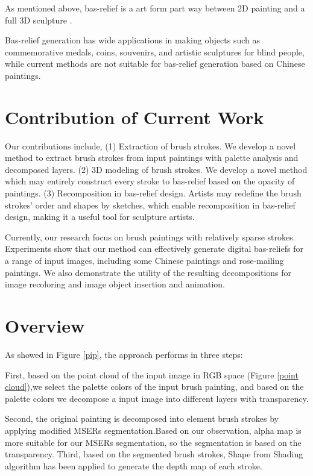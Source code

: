 As mentioned above, bas-relief is a art form part way between 2D painting and a full 3D sculpture\cite{benzaid2017analysis}\cite{weyrich2007digital}\cite{kerber2009feature}\cite{kerber2012computer}\cite{zeng2014region} .

Bas-relief generation has wide applications in making objects such as commemorative medals, coins, souvenirs, and artistic sculptures for blind people, while current methods are not suitable for bas-relief generation based on Chinese paintings. 



\section{Contribution of Current Work}
Our contributions include,
\newline
(1) Extraction of brush strokes. We develop a novel method to extract brush strokes from input paintings with palette analysis and decomposed layers.
\newline
(2) 3D modeling of brush strokes. We develop a novel method which may entirely construct every stroke to bas-relief based on the opacity of paintings.
\newline
(3) Recomposition in bas-relief design. Artists may redefine the brush strokes’ order and shapes by sketches, which enable recomposition in bas-relief design, making it a useful tool for sculpture artists.




Currently, our research focus on brush paintings with relatively sparse strokes. Experiments show that our method can effectively generate digital bas-reliefs for a range of input images, including some Chinese paintings and rose-mailing paintings. We also demonstrate the utility of the resulting decompositions for image recoloring and image object insertion and animation.


\section{Overview}  As showed in Figure \ref{pip}, the approach performs in three steps:

First, based on the point cloud of the input image in RGB space (Figure \ref{point cloud}),we select the palette colors of the input brush painting, and based on the palette colors we decompose a input image into different layers with transparency.  

Second,  the original painting is decomposed into element brush strokes by applying modified MSERs segmentation.Based on our observation, alpha map is more suitable for our MSERs segmentation, so the segmentation is based on the transparency. Third, based on the segmented brush strokes,  Shape from Shading algorithm has been applied to generate the depth map of each stroke.  

